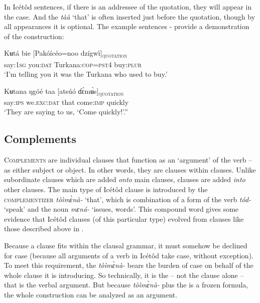 In Icétôd  sentences, if there is an addressee of the quotation, they will appear in the  case. And the   \textit{tàà} ‘that’ is often inserted just before the quotation, though by all appearances it is optional. The example sentences - provide a demonstration of the  construction:



\ea\label{ex:syn:52}
\gll Kʉt{\Í}á     bie   [Pakóícéo=noo   dzígwì]\textsc{\textsubscript{quotation}} \\
say:\textsc{1sg}   you:\textsc{dat} Turkana:\textsc{cop=pst4} buy:\textsc{plur}    \\
\glt ‘I’m telling you it was the Turkana who used to buy.’ 
\z




\ea\label{ex:syn:53}
\gll Kʉtana ŋgóé  taa   [atsúó   ɗ\`{ɛ}m\`{ʉ}s]\textsc{\textsubscript{quotation}}  \\
say:\textsc{ips} we.\textsc{exc}:\textsc{dat}  that   come:\textsc{imp}   quickly    \\
\glt ‘They are saying to us, ‘Come quickly!’.” 
\z






\subsection{Complements}\label{sec:10.6}


\textsc{Complements} are individual clauses that function as an ‘argument’\textsc{} of the verb – as either subject or object. In other words, they are clauses within clauses. Unlike subordinate clauses which are added \textit{onto} main clauses,  clauses are added \textit{into} other clauses. The main type of Icétôd  clause is introduced by the \textsc{complementizer} \textit{tòìm\`{ɛ}nà-} ‘that’, which is combination of a form of the verb \textit{tód-} ‘speak’ and the noun \textit{mɛná-} ‘issues, words’. This compound word gives some evidence that Icétôd  clauses (of this particular type) evolved from  clauses like those described above in .

Because a  clause fits within the clausal grammar, it must somehow be declined for case (because all arguments of a verb in Icétôd take case, without exception). To meet this requirement, the  \textit{tòìm\`{ɛ}nà-} bears the burden of case on behalf of the whole  clause it is introducing. So technically, it is the  – not the  clause alone – that is the verbal argument. But because \textit{tòìm\`{ɛ}nà-} plus the  is a frozen  formula, the whole construction can be analyzed as an argument.

